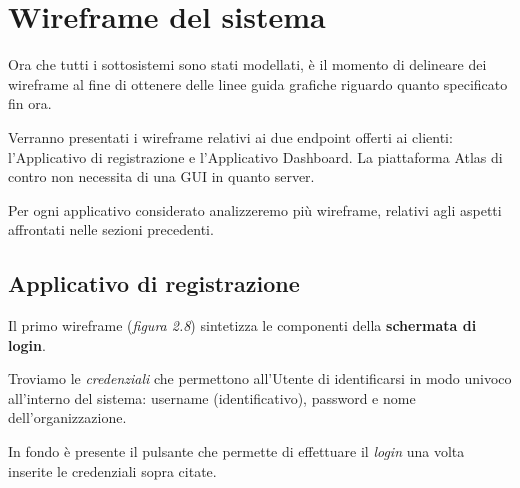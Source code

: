 \vspace{10mm}
\section{Wireframe del sistema}
Ora che tutti i sottosistemi sono stati modellati, è il momento di delineare dei wireframe al fine di ottenere delle linee guida grafiche riguardo quanto specificato fin ora.\newline

\noindent Verranno presentati i wireframe relativi ai due endpoint offerti ai clienti: l'Applicativo di registrazione e l'Applicativo Dashboard.\newline
La piattaforma Atlas di contro non necessita di una GUI in quanto server.\newline

\noindent Per ogni applicativo considerato analizzeremo più wireframe, relativi agli aspetti affrontati nelle sezioni precedenti.
\vspace{50mm}
\subsection{Applicativo di registrazione}
\noindent Il primo wireframe (\emph{figura 2.8}) sintetizza le componenti della {\bf schermata di login}.\newline

\noindent Troviamo le \emph{credenziali} che permettono all'Utente di identificarsi in modo univoco all'interno del sistema: username (identificativo), password e nome dell'organizzazione.\newline

\noindent In fondo è presente il pulsante che permette di effettuare il \emph{login} una volta inserite le credenziali sopra citate.\newline

